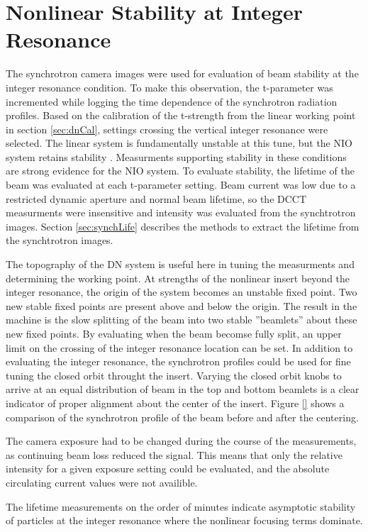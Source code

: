 \section{Nonlinear Stability at Integer Resonance} \label{sec:intCross}
The synchrotron camera images were used for evaluation of beam stability at the integer resonance condition. To make this observation, the t-parameter was incremented while logging the time dependence of the synchrotron radiation profiles. Based on the calibration of the t-strength from the linear working point in section \ref{sec:dnCal}, settings crossing the vertical integer resonance were selected. The linear system is fundamentally unstable at this tune, but the NIO system retains stability . Measurments supporting stability in these conditions are strong evidence for the NIO system. To evaluate stability, the lifetime of the beam was evaluated at each t-parameter setting. Beam current was low due to a restricted dynamic aperture and normal beam lifetime, so the DCCT measurments were insensitive and intensity was evaluated from the synchtrotron images. Section \ref{sec:synchLife} describes the methods to extract the lifetime from the synchtrotron images.

The topography of the DN system is useful here in tuning the measurments and determining the working point. At strengths of the nonlinear insert beyond the integer resonance, the origin of the system becomes an unstable fixed point. Two new stable fixed points are present above and below the origin. The result in the machine is the slow splitting of the beam into two stable ”beamlets” about these new fixed points. By evaluating when the beam becomse fully split, an upper limit on the crossing of the integer resonance location can be set. In addition to evaluating the integer resonance, the synchrotron profiles could be used for fine tuning the closed orbit throught the insert. Varying the closed orbit knobs to arrive at an equal distribution of beam in the top and bottom beamlets is a  clear indicator of proper alignment about the center of the insert. Figure \ref{} shows a comparison of the synchrotron profile of the beam before and after the centering.

The camera exposure had to be changed during the course of the measurements, as continuing beam loss reduced the signal. This means that only the relative intensity for a given exposure setting could be evaluated, and the absolute circulating current values were not availible. 

The lifetime measurements on the order of minutes indicate asymptotic stability of particles at the integer resonance where the nonlinear focusing terms dominate.
